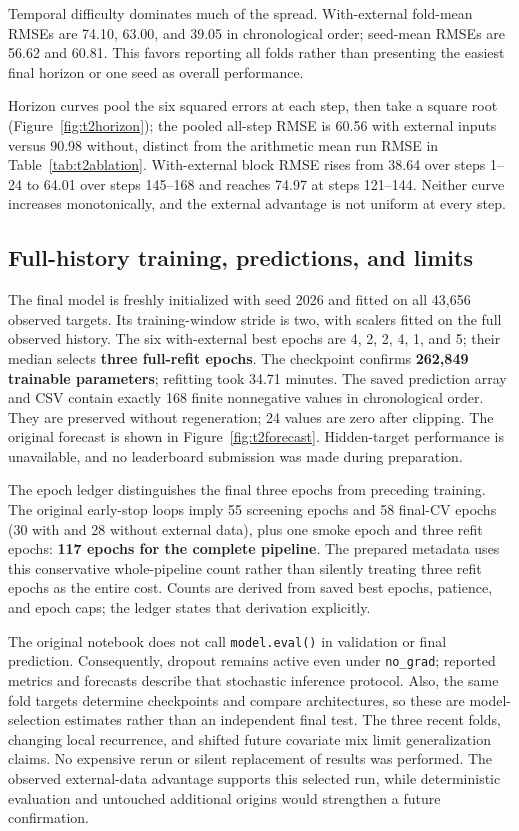 Temporal difficulty dominates much of the spread. With-external fold-mean RMSEs are 74.10, 63.00, and 39.05 in chronological order; seed-mean RMSEs are 56.62 and 60.81. This favors reporting all folds rather than presenting the easiest final horizon or one seed as overall performance.

Horizon curves pool the six squared errors at each step, then take a square root (Figure~\ref{fig:t2horizon}); the pooled all-step RMSE is 60.56 with external inputs versus 90.98 without, distinct from the arithmetic mean run RMSE in Table~\ref{tab:t2ablation}. With-external block RMSE rises from 38.64 over steps 1--24 to 64.01 over steps 145--168 and reaches 74.97 at steps 121--144. Neither curve increases monotonically, and the external advantage is not uniform at every step.

\subsection*{Full-history training, predictions, and limits}
The final model is freshly initialized with seed 2026 and fitted on all 43,656 observed targets. Its training-window stride is two, with scalers fitted on the full observed history. The six with-external best epochs are 4, 2, 2, 4, 1, and 5; their median selects \textbf{three full-refit epochs}. The checkpoint confirms \textbf{262,849 trainable parameters}; refitting took 34.71 minutes. The saved prediction array and CSV contain exactly 168 finite nonnegative values in chronological order. They are preserved without regeneration; 24 values are zero after clipping. The original forecast is shown in Figure~\ref{fig:t2forecast}. Hidden-target performance is unavailable, and no leaderboard submission was made during preparation.

The epoch ledger distinguishes the final three epochs from preceding training. The original early-stop loops imply 55 screening epochs and 58 final-CV epochs (30 with and 28 without external data), plus one smoke epoch and three refit epochs: \textbf{117 epochs for the complete pipeline}. The prepared metadata uses this conservative whole-pipeline count rather than silently treating three refit epochs as the entire cost. Counts are derived from saved best epochs, patience, and epoch caps; the ledger states that derivation explicitly.

The original notebook does not call \texttt{model.eval()} in validation or final prediction. Consequently, dropout remains active even under \texttt{no\_grad}; reported metrics and forecasts describe that stochastic inference protocol. Also, the same fold targets determine checkpoints and compare architectures, so these are model-selection estimates rather than an independent final test. The three recent folds, changing local recurrence, and shifted future covariate mix limit generalization claims. No expensive rerun or silent replacement of results was performed. The observed external-data advantage supports this selected run, while deterministic evaluation and untouched additional origins would strengthen a future confirmation.

